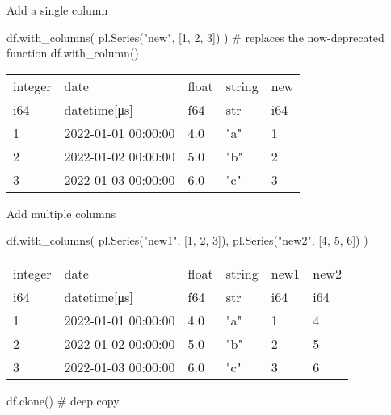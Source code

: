 \documentclass[
  letterpaper,
  DIV=11,
  numbers=noendperiod]{scrartcl}
\newenvironment{Shaded}{\begin{snugshade}}{\end{snugshade}}
\newcommand{\CommentTok}[1]{\textcolor[rgb]{0.37,0.37,0.37}{#1}}
\newcommand{\DecValTok}[1]{\textcolor[rgb]{0.68,0.00,0.00}{#1}}
\newcommand{\NormalTok}[1]{\textcolor[rgb]{0.00,0.23,0.31}{#1}}
\newcommand{\StringTok}[1]{\textcolor[rgb]{0.13,0.47,0.30}{#1}}
\begin{document}
Add a single column

\begin{Shaded}
\begin{Highlighting}[]
\NormalTok{df.with\_columns(}
\NormalTok{    pl.Series(}\StringTok{"new"}\NormalTok{, [}\DecValTok{1}\NormalTok{, }\DecValTok{2}\NormalTok{, }\DecValTok{3}\NormalTok{])}
\NormalTok{    ) }\CommentTok{\# replaces the now{-}deprecated function \textasciigrave{}df.with\_column()\textasciigrave{}}
\end{Highlighting}
\end{Shaded}

\begin{longtable}[]{@{}lllll@{}}
\toprule()
integer & date & float & string & new \\
i64 & datetime{[}μs{]} & f64 & str & i64 \\
\midrule()
\endhead
1 & 2022-01-01 00:00:00 & 4.0 & "a" & 1 \\
2 & 2022-01-02 00:00:00 & 5.0 & "b" & 2 \\
3 & 2022-01-03 00:00:00 & 6.0 & "c" & 3 \\
\bottomrule()
\end{longtable}

Add multiple columns

\begin{Shaded}
\begin{Highlighting}[]
\NormalTok{df.with\_columns(}
\NormalTok{  pl.Series(}\StringTok{"new1"}\NormalTok{, [}\DecValTok{1}\NormalTok{, }\DecValTok{2}\NormalTok{, }\DecValTok{3}\NormalTok{]),}
\NormalTok{  pl.Series(}\StringTok{"new2"}\NormalTok{, [}\DecValTok{4}\NormalTok{, }\DecValTok{5}\NormalTok{, }\DecValTok{6}\NormalTok{])}
\NormalTok{  )}
\end{Highlighting}
\end{Shaded}

\begin{longtable}[]{@{}llllll@{}}
\toprule()
integer & date & float & string & new1 & new2 \\
i64 & datetime{[}μs{]} & f64 & str & i64 & i64 \\
\midrule()
\endhead
1 & 2022-01-01 00:00:00 & 4.0 & "a" & 1 & 4 \\
2 & 2022-01-02 00:00:00 & 5.0 & "b" & 2 & 5 \\
3 & 2022-01-03 00:00:00 & 6.0 & "c" & 3 & 6 \\
\bottomrule()
\end{longtable}

\begin{Shaded}
\begin{Highlighting}[]
\NormalTok{df.clone() }\CommentTok{\# deep copy}
\end{Highlighting}
\end{Shaded}
\end{document}
